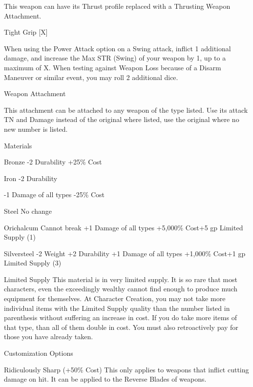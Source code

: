 \documentclass[oneside,11pt,english]{book}
\begin{document}
This weapon can have its Thrust profile replaced with a Thrusting Weapon Attachment. 

Tight Grip 
[X] 

When using the Power Attack option on a Swing attack, inflict 1 additional damage, and increase 
the Max STR (Swing) of your weapon by 1, up to a maximum of X. When testing against Weapon 
Loss because of a Disarm Maneuver or similar event, you may roll 2 additional dice. 

Weapon 
Attachment 

This attachment can be attached to any weapon of the type listed. Use its attack TN and Damage 
instead of the original where listed, use the original where no new number is listed. 

 

Materials 

 

Bronze 
-2 Durability 
+25\% Cost 

 

Iron 
-2 Durability 


-1 Damage of all types 
-25\% Cost 

 

Steel 
No change 

 

Orichalcum 
Cannot break 
+1 Damage of all types 
+5,000\% Cost+5 gp 
Limited Supply (1) 

 

Silversteel 
-2 Weight 
+2 Durability 
+1 Damage of all types 
+1,000\% Cost+1 gp 
Limited Supply (3) 

 

Limited Supply 
This material is in very limited supply. It is so rare that most characters, even the exceedingly wealthy 
cannot find enough to produce much equipment for themselves. At Character Creation, you may not take 
more individual items with the Limited Supply quality than the number listed in parenthesis without 
suffering an increase in cost. If you do take more items of that type, than all of them double in cost. You 
must also retroactively pay for those you have already taken. 

 

 

Customization Options 

 

Ridiculously Sharp (+50\% Cost) 
This only applies to weapons that inflict cutting damage on hit. It can be applied to the Reverse Blades of 
weapons. 
\end{document}
